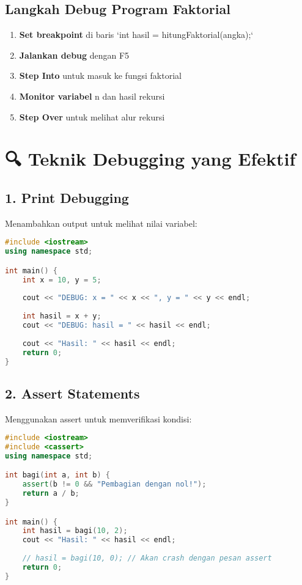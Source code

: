 \subsection{Langkah Debug Program Faktorial}

\begin{enumerate}
\item \textbf{Set breakpoint} di baris `int hasil = hitungFaktorial(angka);`
\item \textbf{Jalankan debug} dengan F5
\item \textbf{Step Into} untuk masuk ke fungsi faktorial
\item \textbf{Monitor variabel} n dan hasil rekursi
\item \textbf{Step Over} untuk melihat alur rekursi
\end{enumerate}

\section{🔍 Teknik Debugging yang Efektif}

\subsection{1. Print Debugging}

Menambahkan output untuk melihat nilai variabel:

\begin{lstlisting}[language=c++, caption=Print Debugging]
#include <iostream>
using namespace std;

int main() {
    int x = 10, y = 5;
    
    cout << "DEBUG: x = " << x << ", y = " << y << endl;
    
    int hasil = x + y;
    cout << "DEBUG: hasil = " << hasil << endl;
    
    cout << "Hasil: " << hasil << endl;
    return 0;
}
\end{lstlisting}

\subsection{2. Assert Statements}

Menggunakan assert untuk memverifikasi kondisi:

\begin{lstlisting}[language=c++, caption=Assert Debugging]
#include <iostream>
#include <cassert>
using namespace std;

int bagi(int a, int b) {
    assert(b != 0 && "Pembagian dengan nol!");
    return a / b;
}

int main() {
    int hasil = bagi(10, 2);
    cout << "Hasil: " << hasil << endl;
    
    // hasil = bagi(10, 0); // Akan crash dengan pesan assert
    return 0;
}
\end{lstlisting}

